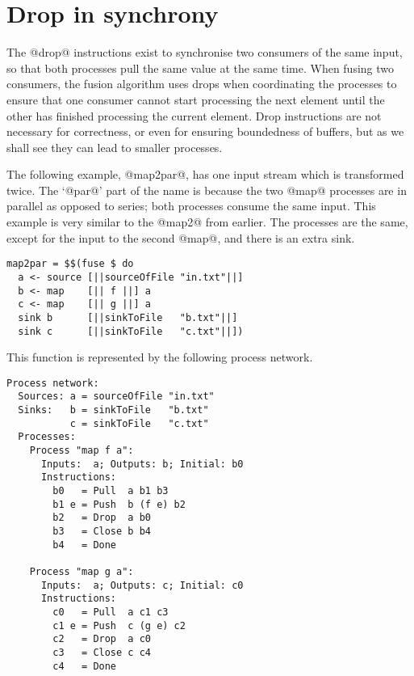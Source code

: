 \section{Drop in synchrony}
\label{s:Drop:in:synchrony}

The @drop@ instructions exist to synchronise two consumers of the same input, so that both processes pull the same value at the same time.
When fusing two consumers, the fusion algorithm uses drops when coordinating the processes to ensure that one consumer cannot start processing the next element until the other has finished processing the current element.
Drop instructions are not necessary for correctness, or even for ensuring boundedness of buffers, but as we shall see they can lead to smaller processes.

The following example, @map2par@, has one input stream which is transformed twice.
The `@par@' part of the name is because the two @map@ processes are in parallel as opposed to series; both processes consume the same input.
This example is very similar to the @map2@ from earlier.
The processes are the same, except for the input to the second @map@, and there is an extra sink.

\begin{lstlisting}
map2par = $$(fuse $ do
  a <- source [||sourceOfFile "in.txt"||]
  b <- map    [|| f ||] a
  c <- map    [|| g ||] a
  sink b      [||sinkToFile   "b.txt"||]
  sink c      [||sinkToFile   "c.txt"||])
\end{lstlisting}

This function is represented by the following process network.

\begin{lstlisting}[linebackgroundcolor={
  \hilineFst{9}
  \hilineFst{10}
  \hilineFst{11}
  \hilineFst{12}
  \hilineFst{13}
  \hilineSnd{18}
  \hilineSnd{19}
  \hilineSnd{20}
  \hilineSnd{21}
  \hilineSnd{22}
  }]
Process network:
  Sources: a = sourceOfFile "in.txt"
  Sinks:   b = sinkToFile   "b.txt"
           c = sinkToFile   "c.txt"
  Processes:
    Process "map f a":
      Inputs:  a; Outputs: b; Initial: b0
      Instructions:
        b0   = Pull  a b1 b3
        b1 e = Push  b (f e) b2
        b2   = Drop  a b0
        b3   = Close b b4        
        b4   = Done

    Process "map g a":
      Inputs:  a; Outputs: c; Initial: c0
      Instructions:
        c0   = Pull  a c1 c3      
        c1 e = Push  c (g e) c2     
        c2   = Drop  a c0
        c3   = Close c c4         
        c4   = Done
\end{lstlisting}

